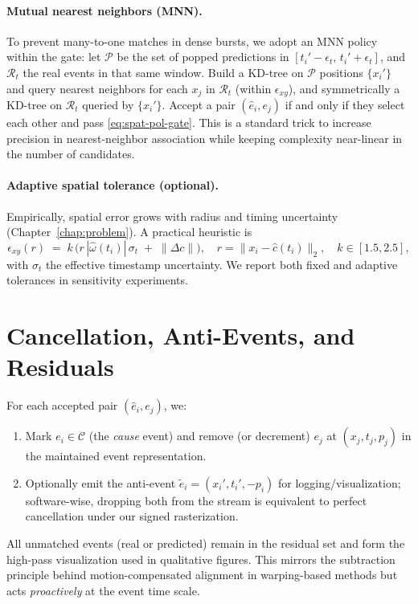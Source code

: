 \paragraph{Mutual nearest neighbors (MNN).}
To prevent many-to-one matches in dense bursts, we adopt an MNN policy within the gate: let $\mathcal{P}$ be the set of popped predictions in $[t_i'-\epsilon_t,\,t_i'+\epsilon_t]$, and $\mathcal{R}_t$ the real events in that same window. Build a KD-tree on $\mathcal{P}$ positions $\{x_i'\}$ and query nearest neighbors for each $x_j$ in $\mathcal{R}_t$ (within $\epsilon_{xy}$), and symmetrically a KD-tree on $\mathcal{R}_t$ queried by $\{x_i'\}$. Accept a pair $(\hat e_i,e_j)$ if and only if they select each other and pass \eqref{eq:spat-pol-gate}. This is a standard trick to increase precision in nearest-neighbor association while keeping complexity near-linear in the number of candidates.

\paragraph{Adaptive spatial tolerance (optional).}
Empirically, spatial error grows with radius and timing uncertainty (Chapter~\ref{chap:problem}). A practical heuristic is
\begin{equation}
\epsilon_{xy}(r) \;=\; k \,\big(r\,|\hat\omega(t_i)|\,\sigma_t \;+\; \|\Delta c\|\big),
\quad r=\|x_i-\hat c(t_i)\|_2, \quad k\in[1.5,2.5],
\label{eq:adaptive-eps}
\end{equation}
with $\sigma_t$ the effective timestamp uncertainty. We report both fixed and adaptive tolerances in sensitivity experiments.

\section{Cancellation, Anti-Events, and Residuals}
For each accepted pair $(\hat e_i,e_j)$, we:
\begin{enumerate}
    \item Mark $e_i \in \mathcal{C}$ (the \emph{cause} event) and remove (or decrement) $e_j$ at $(x_j,t_j,p_j)$ in the maintained event representation.
    \item Optionally emit the anti-event $\tilde e_i=(x_i',t_i',-p_i)$ for logging/visualization; software-wise, dropping both from the stream is equivalent to perfect cancellation under our signed rasterization.
\end{enumerate}
All unmatched events (real or predicted) remain in the residual set and form the high-pass visualization used in qualitative figures. This mirrors the subtraction principle behind motion-compensated alignment in warping-based methods \cite{Gallego2018CMax,Stoffregen2019Segmentation} but acts \emph{proactively} at the event time scale.


